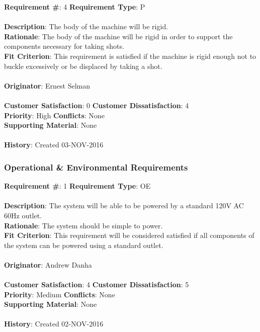 \documentclass[titlepage]{article}
\begin{document}
\begin{framed}
	\noindent\textbf{Requirement \#}: 4 \hfill \textbf{Requirement Type}: P \hfill\\\\
	\noindent\textbf{Description}: The body of the machine will be rigid. \\
	\textbf{Rationale}: The body of the machine will be rigid in order to support the components necessary for taking shots.\\
	\textbf{Fit Criterion}: This requirement is satisfied if the machine is rigid enough not to buckle excessively or be displaced by taking a shot.\\\\
	\textbf{Originator}: Ernest Selman\\\\
	\noindent\textbf{Customer Satisfaction}: 0 \hfill 	\textbf{Customer Dissatisfaction}: 4 \hfill\\
	\textbf{Priority}: High \hfill \textbf{Conflicts}: None \hfill\\
	\textbf{Supporting Material}: None\\\\
	\noindent\textbf{History}: Created 03-NOV-2016
\end{framed}

\newpage
\subsubsection{Operational \& Environmental Requirements}
\begin{framed}
	\noindent\textbf{Requirement \#}: 1 \hfill \textbf{Requirement Type}: OE \hfill\\\\
	\noindent\textbf{Description}: The system will be able to be powered by a standard 120V AC 60Hz outlet.\\
	\textbf{Rationale}: The system should be simple to power.\\
	\textbf{Fit Criterion}: This requirement will be considered satisfied if all components of the system can be powered using a standard outlet.\\\\
	\textbf{Originator}: Andrew Danha\\\\
	\noindent\textbf{Customer Satisfaction}: 4 \hfill 	\textbf{Customer Dissatisfaction}: 5 \hfill\\
	\textbf{Priority}: Medium \hfill \textbf{Conflicts}: None \hfill\\
	\textbf{Supporting Material}: None\\\\
	\noindent\textbf{History}: Created 02-NOV-2016
\end{framed}
\end{document}
